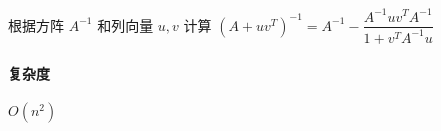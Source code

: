 根据方阵 \(A^{-1}\) 和列向量 \(u,v\) 计算 \((A+uv^T)^{-1}=A^{-1}-\dfrac{A^{-1}uv^TA^{-1}}{1+v^TA^{-1}u}\)

\paragraph{复杂度} \(O(n^2)\)